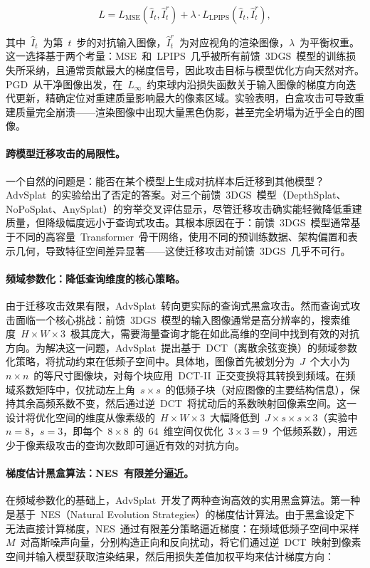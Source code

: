 \begin{equation}
    L = L_{\text{MSE}}(\hat{I}_t, \hat{I}_t^r) + \lambda \cdot L_{\text{LPIPS}}(\hat{I}_t, \hat{I}_t^r),
\end{equation}

其中~$\hat{I}_t$~为第~$t$~步的对抗输入图像，$\hat{I}_t^r$~为对应视角的渲染图像，$\lambda$~为平衡权重。这一选择基于两个考量：MSE~和~LPIPS~几乎被所有前馈~3DGS~模型的训练损失所采纳，且通常贡献最大的梯度信号，因此攻击目标与模型优化方向天然对齐。PGD~从干净图像出发，在~$L_\infty$~约束球内沿损失函数关于输入图像的梯度方向迭代更新，精确定位对重建质量影响最大的像素区域。实验表明，白盒攻击可导致重建质量完全崩溃——渲染图像中出现大量黑色伪影，甚至完全坍塌为近乎全白的图像。

\paragraph{跨模型迁移攻击的局限性。}
一个自然的问题是：能否在某个模型上生成对抗样本后迁移到其他模型？AdvSplat~的实验给出了否定的答案。对三个前馈~3DGS~模型（DepthSplat、NoPoSplat、AnySplat）的穷举交叉评估显示，尽管迁移攻击确实能轻微降低重建质量，但降级幅度远小于查询式攻击。其根本原因在于：前馈~3DGS~模型通常基于不同的高容量~Transformer~骨干网络，使用不同的预训练数据、架构偏置和表示几何，导致特征空间差异显著——这使迁移攻击对前馈~3DGS~几乎不可行。

\paragraph{频域参数化：降低查询维度的核心策略。}
由于迁移攻击效果有限，AdvSplat~转向更实际的查询式黑盒攻击。然而查询式攻击面临一个核心挑战：前馈~3DGS~模型的输入图像通常是高分辨率的，搜索维度~$H \times W \times 3$~极其庞大，需要海量查询才能在如此高维的空间中找到有效的对抗方向。为解决这一问题，AdvSplat~提出基于~DCT（离散余弦变换）的频域参数化策略，将扰动约束在低频子空间中。具体地，图像首先被划分为~$J$~个大小为~$n \times n$~的等尺寸图像块，对每个块应用~DCT-II~正交变换将其转换到频域。在频域系数矩阵中，仅扰动左上角~$s \times s$~的低频子块（对应图像的主要结构信息），保持其余高频系数不变，然后通过逆~DCT~将扰动后的系数映射回像素空间。这一设计将优化空间的维度从像素级的~$H \times W \times 3$~大幅降低到~$J \times s \times s \times 3$（实验中~$n=8$，$s=3$，即每个~$8 \times 8$~的~64~维空间仅优化~$3 \times 3=9$~个低频系数），用远少于像素级攻击的查询次数即可逼近有效的对抗方向。

\paragraph{梯度估计黑盒算法：NES~有限差分逼近。}
在频域参数化的基础上，AdvSplat~开发了两种查询高效的实用黑盒算法。第一种是基于~NES（Natural Evolution Strategies）的梯度估计算法。由于黑盒设定下无法直接计算梯度，NES~通过有限差分策略逼近梯度：在频域低频子空间中采样~$M$~对高斯噪声向量，分别构造正向和反向扰动，将它们通过逆~DCT~映射到像素空间并输入模型获取渲染结果，然后用损失差值加权平均来估计梯度方向：

